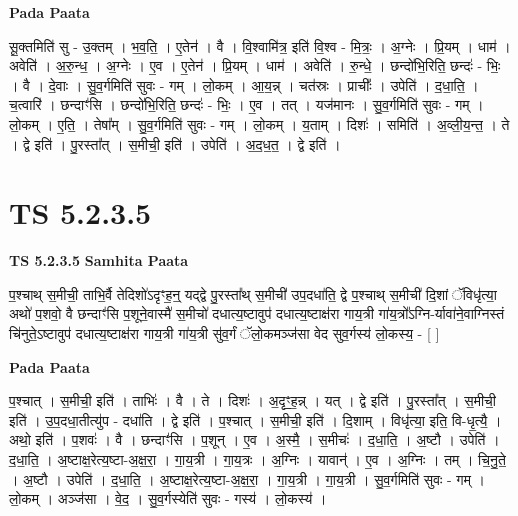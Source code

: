 \documentclass[17pt]{extarticle}
\begin{document}
\textbf{Pada Paata} \newline

सू॒क्तमिति॑ सु - उ॒क्तम् । भ॒व॒ति॒ । ए॒तेन॑ । वै । वि॒श्वामि॑त्र॒ इति॑ वि॒श्व - मि॒त्रः॒ । अ॒ग्नेः । प्रि॒यम् । धाम॑ । अवेति॑ । अ॒रु॒न्ध॒ । अ॒ग्नेः । ए॒व । ए॒तेन॑ । प्रि॒यम् । धाम॑ । अवेति॑ । रु॒न्धे॒ । छन्दो॑भि॒रिति॒ छन्दः॑ - भिः॒ । वै । दे॒वाः । सु॒व॒र्गमिति॑ सुवः - गम् । लो॒कम् । आ॒य॒न्न् । चत॑स्रः । प्राचीः᳚ । उपेति॑ । द॒धा॒ति॒ । च॒त्वारि॑ । छन्दाꣳ॑सि । छन्दो॑भि॒रिति॒ छन्दः॑ - भिः॒ । ए॒व । तत् । यज॑मानः । सु॒व॒र्गमिति॑ सुवः - गम् । लो॒कम् । ए॒ति॒ । तेषा᳚म् । सु॒व॒र्गमिति॑ सुवः - गम् । लो॒कम् । य॒ताम् । दिशः॑ । समिति॑ । अ॒व्ली॒य॒न्त॒ । ते । द्वे इति॑ । पु॒रस्ता᳚त् । स॒मीची॒ इति॑ । उपेति॑ । अ॒द॒ध॒त॒ । द्वे इति॑ ।  \newline





\section{ TS 5.2.3.5 }

\textbf{TS 5.2.3.5 } \newline
\textbf{Samhita Paata} \newline

प॒श्चाथ् स॒मीची॒ ताभि॒र्वै तेदिशो॑ऽदृꣳह॒न्॒ यद्द्वे पु॒रस्ता᳚थ् स॒मीची॑ उप॒दधा॑ति॒ द्वे प॒॒श्चाथ् स॒मीची॑ दि॒शां ॅविधृ॑त्या॒ अथो॑ प॒शवो॒ वै छन्दाꣳ॑सि प॒शूने॒वास्मै॑ स॒मीचो॑ दधात्य॒ष्टावुप॑ दधात्य॒ष्टाक्ष॑रा गाय॒त्री गा॑य॒त्रो᳚ऽग्नि-र्यावा॑ने॒वाग्निस्तं चि॑नुते॒ऽष्टावुप॑ दधात्य॒ष्टाक्ष॑रा गाय॒त्री गा॑य॒त्री सु॑व॒र्गं ॅलो॒कमञ्ज॑सा वेद सुव॒र्गस्य॑ लो॒कस्य॒ - [  ] \newline

\textbf{Pada Paata} \newline

प॒श्चात् । स॒मीची॒ इति॑ । ताभिः॑ । वै । ते । दिशः॑ । अ॒दृꣳ॒॒ह॒न्न् । यत् । द्वे इति॑ । पु॒रस्ता᳚त् । स॒मीची॒ इति॑ । उ॒प॒दधा॒तीत्यु॑प - दधा॑ति । द्वे इति॑ । प॒श्चात् । स॒मीची॒ इति॑ । दि॒शाम् । विधृ॑त्या॒ इति॒ वि-धृ॒त्यै॒ । अथो॒ इति॑ । प॒शवः॑ । वै । छन्दाꣳ॑सि । प॒शून् । ए॒व । अ॒स्मै॒ । स॒मीचः॑ । द॒धा॒ति॒ । अ॒ष्टौ । उपेति॑ । द॒धा॒ति॒ । अ॒ष्टाक्ष॒रेत्य॒ष्टा-अ॒क्ष॒रा॒ । गा॒य॒त्री । गा॒य॒त्रः । अ॒ग्निः । यावान्॑ । ए॒व । अ॒ग्निः । तम् । चि॒नु॒ते॒ । अ॒ष्टौ । उपेति॑ । द॒धा॒ति॒ । अ॒ष्टाक्ष॒रेत्य॒ष्टा-अ॒क्ष॒रा॒ । गा॒य॒त्री । गा॒य॒त्री । सु॒व॒र्गमिति॑ सुवः - गम् । लो॒कम् । अञ्ज॑सा । वे॒द॒ । सु॒व॒र्गस्येति॑ सुवः - गस्य॑ । लो॒कस्य॑ ।  \newline
\end{document}
